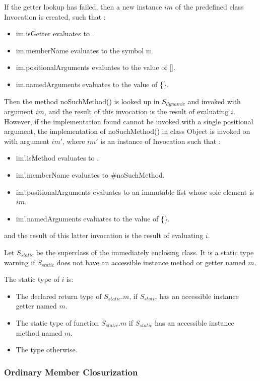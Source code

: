 \documentclass{article}
\newcommand{\code}[1]{{\sf #1}}
\begin{document}
\LMHash{}
If the getter lookup has failed, then a new instance $im$  of the predefined class  \code{Invocation}  is created, such that :
\begin{itemize}
\item  \code{im.isGetter} evaluates to \code{\TRUE{}}.
\item  \code{im.memberName} evaluates to the symbol \code{m}.
\item \code{im.positionalArguments} evaluates to the value of \code{\CONST{} []}.
\item \code{im.namedArguments} evaluates to the value of \code{\CONST{} \{\}}.
\end{itemize}
Then the method \code{noSuchMethod()} is looked up in $S_{dynamic}$ and invoked  with argument $im$, and the result of this invocation is the result of evaluating $i$. However, if the implementation found cannot be invoked with a single positional argument, the implementation  of \code{noSuchMethod()} in class \code{Object} is invoked on \THIS{} with argument $im'$, where $im'$ is an instance of \code{Invocation} such that :
\begin{itemize}
\item  \code{im'.isMethod} evaluates to \code{\TRUE{}}.
\item  \code{im'.memberName} evaluates to \code{\#noSuchMethod}.
\item \code{im'.positionalArguments} evaluates to an immutable list whose sole element is  $im$.
\item \code{im'.namedArguments} evaluates to the value of \code{\CONST{} \{\}}.
\end{itemize}
and the result of this latter invocation is the result of evaluating $i$.

\LMHash{}
Let $S_{static}$ be the superclass of the immediately enclosing class. It is a static type warning if $S_{static}$ does not have an accessible instance method or getter named $m$.

The static type of $i$ is:
\begin{itemize}
\item The declared return type of $S_{static}.m$, if $S_{static}$ has an accessible instance getter named $m$.
\item The static type of function $S_{static}.m$ if $S_{static}$ has an accessible instance method named $m$.
\item The type  \DYNAMIC{} otherwise.
\end{itemize}


\subsubsection{Ordinary Member Closurization}
\end{document}
